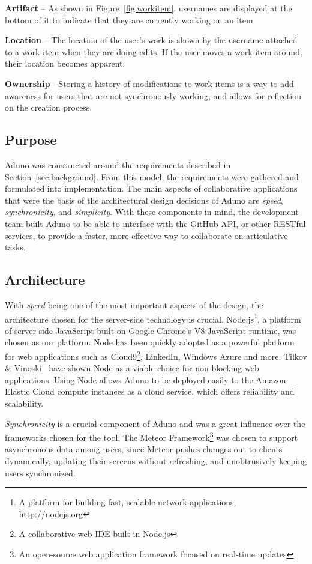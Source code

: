 \documentclass[conference]{IEEEtran}
\begin{document}
{\bf Artifact} – As shown in Figure~\ref{fig:workitem}, usernames are displayed at the bottom of it to indicate that they are currently working on an item.

{\bf Location} – The location of the user’s work is shown by the username attached to a work item when they are doing edits. If the user moves a work item around, their location becomes apparent.

{\bf Ownership} - Storing a history of modifications to work items is a way to add awareness for users that are not synchronously working, and allows for reflection on the creation process.

\subsection{Purpose}
Aduno was constructed around the requirements described in Section~\ref{sec:background}.  From this model, the requirements were gathered and formulated into implementation.  The main aspects of collaborative applications that were the basis of the architectural design decisions of Aduno are \emph{speed}, \emph{synchronicity}, and \emph{simplicity}.  With these components in mind, the development team built Aduno to be able to interface with the GitHub API, or other RESTful services, to provide a faster, more effective way to collaborate on articulative tasks. 

\subsection{Architecture}
With \emph{speed} being one of the most important aspects of the design, the architecture chosen for the server-side technology is crucial.  Node.js\footnote{A platform for building fast, scalable network applications, http://nodejs.org}, a platform of server-side JavaScript built on Google Chrome's V8 JavaScript runtime, was chosen as our platform.  Node has been quickly adopted as a powerful platform for web applications such as Cloud9\footnote{A collaborative web IDE built in Node.js}, LinkedIn, Windows Azure and more.  Tilkov \& Vinoski~\cite{TV10} have shown Node as a viable choice for non-blocking web applications.  Using Node allows Aduno to be deployed easily to the Amazon Elastic Cloud compute instances as a cloud service, which offers reliability and scalability.

\emph{Synchronicity} is a crucial component of Aduno and was a great influence over the frameworks chosen for the tool.  The Meteor Framework\footnote{An open-source web application framework focused on real-time updates} was chosen to support asynchronous data among users, since Meteor pushes changes out to clients dynamically, updating their screens without refreshing, and unobtrusively keeping users synchronized.  
\end{document}
